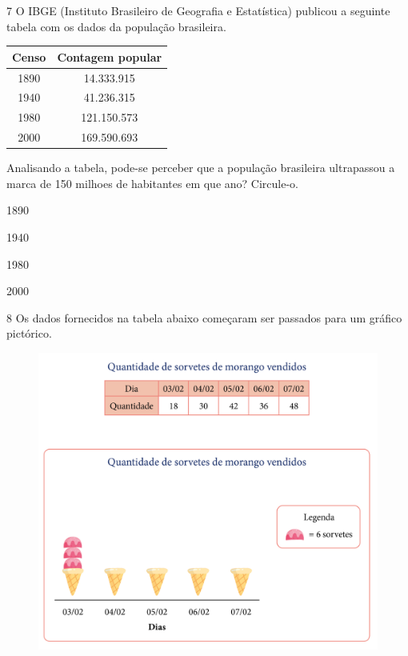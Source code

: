 \num{7} O IBGE (Instituto Brasileiro de Geografia e Estatística) publicou a
seguinte tabela com os dados da população brasileira.

\begin{center}
\begin{tabular}{c|c}
\hline
\multicolumn{1}{l|}{Censo} & \multicolumn{1}{l}{Contagem popular} \\ \hline
1890 & 14.333.915 \\ \hline
1940 & 41.236.315 \\ \hline
1980 & 121.150.573 \\ \hline
2000 & 169.590.693 \\ \hline
\end{tabular}
\end{center}

Analisando a tabela, pode-se perceber que a população brasileira
ultrapassou a marca de 150 milhoes de habitantes em que ano? Circule-o.

\begin{escolha}
\item
  1890
\item
  1940
\item
  1980
\item
  2000
\end{escolha}


\pagebreak
\num{8} Os dados fornecidos na tabela abaixo começaram ser passados para um
gráfico pictórico.

\begin{figure}[htpb!]
\centering
\includegraphics[width=\textwidth]{../ilustracoes/MAT5/SAEB_5ANO_MAT_figura61.png}
\end{figure}

